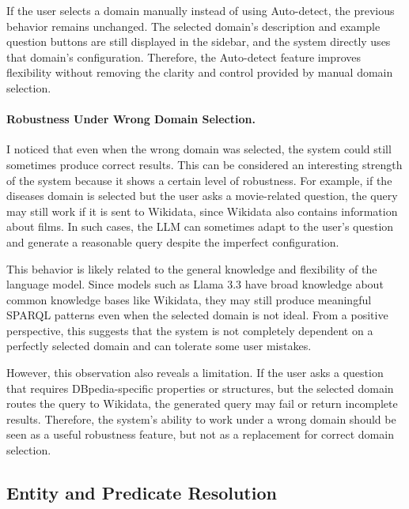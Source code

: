 \documentclass[11pt,a4paper]{article}
\begin{document}
If the user selects a domain manually instead of using Auto-detect, the previous behavior remains unchanged. The selected domain’s description and example question buttons are still displayed in the sidebar, and the system directly uses that domain’s configuration. Therefore, the Auto-detect feature improves flexibility without removing the clarity and control provided by manual domain selection.

\paragraph{Robustness Under Wrong Domain Selection.}

I noticed that even when the wrong domain was selected, the system could still sometimes produce correct results. This can be considered an interesting strength of the system because it shows a certain level of robustness. For example, if the diseases domain is selected but the user asks a movie-related question, the query may still work if it is sent to Wikidata, since Wikidata also contains information about films. In such cases, the LLM can sometimes adapt to the user’s question and generate a reasonable query despite the imperfect configuration.

This behavior is likely related to the general knowledge and flexibility of the language model. Since models such as Llama 3.3 have broad knowledge about common knowledge bases like Wikidata, they may still produce meaningful SPARQL patterns even when the selected domain is not ideal. From a positive perspective, this suggests that the system is not completely dependent on a perfectly selected domain and can tolerate some user mistakes.

However, this observation also reveals a limitation. If the user asks a question that requires DBpedia-specific properties or structures, but the selected domain routes the query to Wikidata, the generated query may fail or return incomplete results. Therefore, the system’s ability to work under a wrong domain should be seen as a useful robustness feature, but not as a replacement for correct domain selection.











\subsection{Entity and Predicate Resolution}
\label{sec:entity-resolution}
\end{document}
